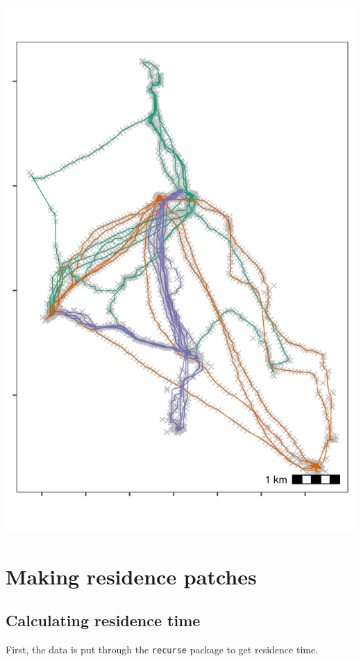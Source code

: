\documentclass[
]{scrreprt}
\begin{document}
\includegraphics{figures/fig_bat_smooth.png}

\hypertarget{making-residence-patches}{%
\section{Making residence patches}\label{making-residence-patches}}

\hypertarget{calculating-residence-time}{%
\subsection{Calculating residence time}\label{calculating-residence-time}}

First, the data is put through the \texttt{recurse} package to get residence time.
\end{document}
